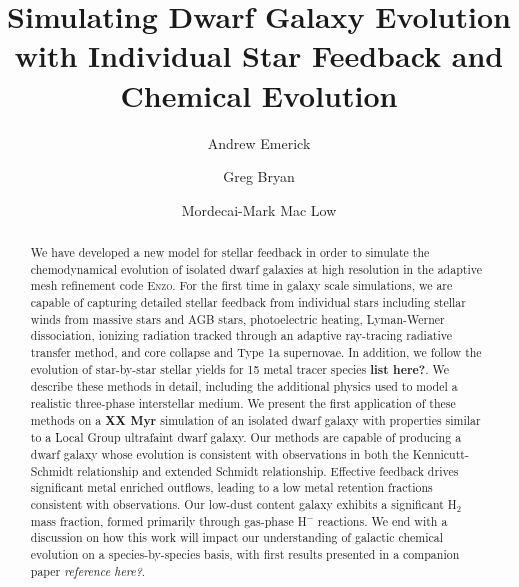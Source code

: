 \documentclass[twocolumn]{aastex61}
\begin{document}
\title{Simulating Dwarf Galaxy Evolution with Individual Star Feedback and Chemical Evolution}
\author{Andrew Emerick}
\author{Greg Bryan}
\author{Mordecai-Mark Mac Low}


\begin{abstract}
We have developed a new model for stellar feedback in order to simulate the chemodynamical evolution of isolated dwarf galaxies at high resolution in the adaptive mesh refinement code \textsc{Enzo}. For the first time in galaxy scale simulations, we are capable of capturing detailed stellar feedback from individual stars including stellar winds from massive stars and AGB stars, photoelectric heating, Lyman-Werner dissociation, ionizing radiation tracked through an adaptive ray-tracing radiative transfer method, and core collapse and Type 1a supernovae. 
In addition, we follow the evolution of star-by-star stellar yields for 15 metal tracer species \textbf{list here?}. We describe these methods in detail, including the additional physics used to model a realistic three-phase interstellar medium. We present the first application of these methods on a \textbf{XX Myr} simulation of an isolated dwarf galaxy with properties similar to a Local Group ultrafaint dwarf galaxy. Our methods are capable of producing a dwarf galaxy whose evolution is consistent with observations in both the Kennicutt-Schmidt relationship and extended Schmidt relationship. Effective feedback drives significant metal enriched outflows, leading to a low metal retention fractions consistent with observations. Our low-dust content galaxy exhibits a significant H$_2$ mass fraction, formed primarily through gas-phase H$^{-}$ reactions. We end with a discussion on how this work will impact our understanding of galactic chemical evolution on a species-by-species basis, with first results presented in a companion paper \textit{reference here?}.
\end{abstract}
\end{document}
